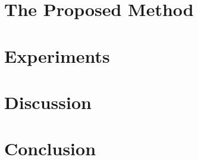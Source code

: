 \documentclass{sig-alternate}
\begin{document}
\section{The Proposed Method}
\label{sec:algorithm}


%
%
\section{Experiments}
\label{sec:experiments}



%
%
\section{Discussion}
\label{sec:discussion}


%
%
\section{Conclusion}
\label{sec:conclusion}



%
%
%


\end{document}
